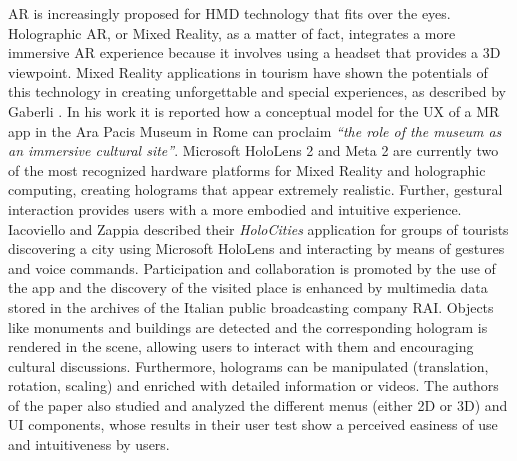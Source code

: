 AR is increasingly proposed for \gls{HMD} technology that fits over the eyes. Holographic AR, or Mixed Reality, as a matter of fact, integrates a more immersive AR experience because it involves using a headset that provides a 3D viewpoint.
Mixed Reality applications in tourism have shown the potentials of this technology in creating unforgettable and special experiences, as described by Gaberli \cite{gaberli_tourism_2019}. In his work it is reported how a conceptual model for the UX of a MR app in the Ara Pacis Museum \cite{jung_impact_2020} in Rome can proclaim \textit{“the role of the museum as an immersive cultural site”}.
Microsoft HoloLens 2 and Meta 2 are currently two of the most recognized hardware platforms for Mixed Reality and holographic computing, creating holograms that appear extremely realistic. Further, gestural interaction provides users with a more embodied and intuitive experience. 
Iacoviello and Zappia \cite{iacoviello_holocities_2020} described their \textit{HoloCities} application for groups of tourists discovering a city using Microsoft HoloLens and interacting by means of gestures and voice commands. Participation and collaboration is promoted by the use of the app and the discovery of the visited place is enhanced by multimedia data stored in the archives of the Italian public broadcasting company RAI. Objects like monuments and buildings are detected and the corresponding hologram is rendered in the scene, allowing users to interact with them and encouraging cultural discussions. Furthermore, holograms can be manipulated (translation, rotation, scaling) and enriched with detailed information or videos.
The authors of the paper also studied and analyzed the different menus (either 2D or 3D) and UI components, whose results in their user test show a perceived easiness of use and intuitiveness by users.

